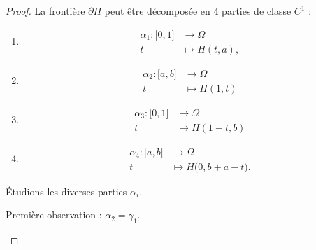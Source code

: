 \begin{proof}
    La frontière \( \partial H\) peut être décomposée en \( 4\) parties de classe \( C^1\) :
    \begin{enumerate}
        \item
            \begin{equation}
                \begin{aligned}
                    \alpha_1\colon \mathopen[ 0 , 1 \mathclose]&\to \Omega \\
                    t&\mapsto H(t,a), 
                \end{aligned}
            \end{equation}
        \item
            \begin{equation}
                \begin{aligned}
                    \alpha_2\colon \mathopen[ a , b \mathclose]&\to \Omega \\
                    t&\mapsto H(1,t)
                \end{aligned}
            \end{equation}
        \item
            \begin{equation}
                \begin{aligned}
                    \alpha_3\colon \mathopen[ 0 , 1 \mathclose]&\to \Omega \\
                    t&\mapsto H(1-t,b) 
                \end{aligned}
            \end{equation}
        \item
            \begin{equation}
                \begin{aligned}
                    \alpha_4\colon \mathopen[ a , b \mathclose]&\to \Omega \\
                    t&\mapsto H\big(0, b+a-t).
                \end{aligned}
            \end{equation}
    \end{enumerate}
    Étudions les diverses parties \( \alpha_i\).
    \begin{subproof}
    Première observation : \( \alpha_2=\gamma_1\). 

\end{subproof}
\end{proof}
